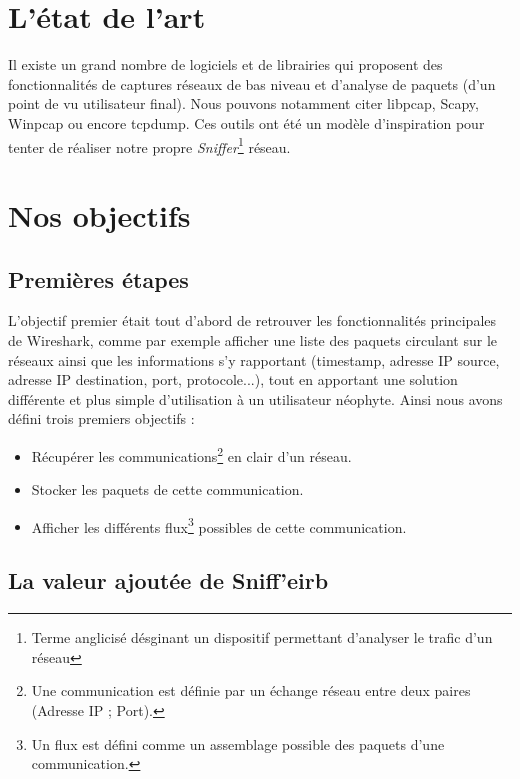 

\section{L'état de l'art}
Il existe un grand nombre de logiciels et de librairies qui proposent des fonctionnalités de captures réseaux de bas niveau et d'analyse de paquets (d'un point de vu utilisateur final). 
Nous pouvons notamment citer libpcap, Scapy, Winpcap ou encore tcpdump. Ces outils ont été un modèle d'inspiration pour tenter de réaliser notre propre \textit{Sniffer}\footnote{Terme anglicisé désginant un dispositif permettant d'analyser le trafic d'un réseau} réseau.\\

\section{Nos objectifs}
\subsection{Premières étapes}
L'objectif premier était tout d'abord de retrouver les fonctionnalités principales de Wireshark, comme par exemple afficher une liste des paquets circulant sur le réseaux ainsi que les informations s'y rapportant (timestamp, adresse IP source, adresse IP destination, port, protocole...), tout en apportant une solution différente et plus simple d'utilisation à un utilisateur néophyte. Ainsi nous avons défini trois premiers objectifs :
\begin{itemize}
\item Récupérer les communications\footnote{Une communication est définie par un échange réseau entre deux paires (Adresse IP ; Port).} en clair d'un réseau.
\item Stocker les paquets de cette communication.
\item Afficher les différents flux\footnote{Un flux est défini comme un assemblage possible des paquets d'une communication.} possibles de cette communication.\\
\end{itemize}

\subsection{La valeur ajoutée de Sniff'eirb}

